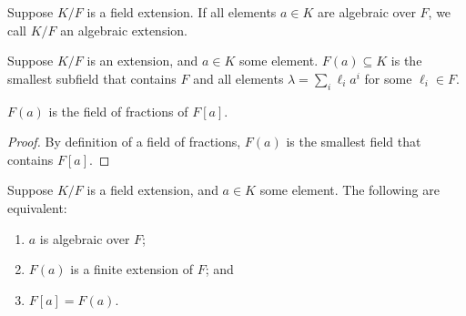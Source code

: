 \begin{definition}
    Suppose \(K/F\) is a field extension.
    If all elements \(a \in K\) are algebraic over \(F\),
    we call \(K/F\) an algebraic extension.
\end{definition}
\begin{definition}
    Suppose \(K/F\) is an extension, and \(a \in K\) some element.
    \(F(a) \subseteq K\) is the smallest subfield that contains \(F\)
    and all elements \(\lambda = \sum_i \ell_i a^i\) for some \(\ell_i \in F\).
\end{definition}
\begin{proposition}
    \(F(a)\) is the field of fractions of \(F[a]\).
\end{proposition}
\begin{proof}
    By definition of a field of fractions,
    \(F(a)\) is the smallest field that contains \(F[a]\).
\end{proof}
\begin{theorem}\label{thm:algebraic-finite-extension}
    Suppose \(K/F\) is a field extension, and \(a \in K\) some element.
    The following are equivalent:
    \begin{enumerate}[label={(\roman*)}, itemsep=0mm]
        \item \(a\) is algebraic over \(F\);
        \item \(F(a)\) is a finite extension of \(F\); and
        \item \(F[a] = F(a)\).
    \end{enumerate}
\end{theorem}
